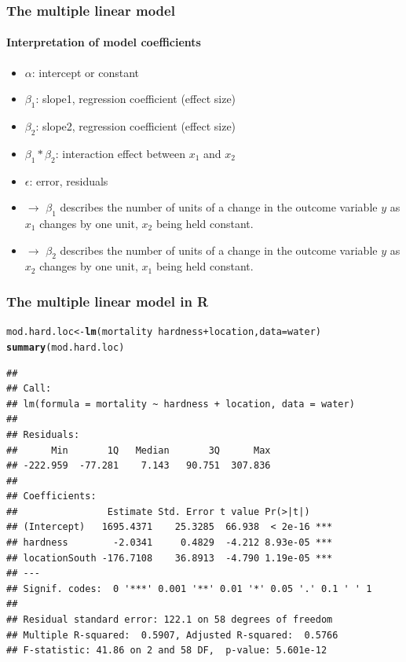 \documentclass{beamer}\usepackage[]{graphicx}\usepackage[]{color}
\makeatletter
\newcommand{\hlopt}[1]{\textcolor[rgb]{0,0,0}{#1}}%
\newcommand{\hlstd}[1]{\textcolor[rgb]{0.345,0.345,0.345}{#1}}%
\newcommand{\hlkwb}[1]{\textcolor[rgb]{0.69,0.353,0.396}{#1}}%
\newcommand{\hlkwc}[1]{\textcolor[rgb]{0.333,0.667,0.333}{#1}}%
\newcommand{\hlkwd}[1]{\textcolor[rgb]{0.737,0.353,0.396}{\textbf{#1}}}%
\newenvironment{kframe}{%
 \def\at@end@of@kframe{}%
 \ifinner\ifhmode%
  \def\at@end@of@kframe{\end{minipage}}%
  \begin{minipage}{\columnwidth}%
 \fi\fi%
 \def\FrameCommand##1{\hskip\@totalleftmargin \hskip-\fboxsep
 \colorbox{shadecolor}{##1}\hskip-\fboxsep
     \hskip-\linewidth \hskip-\@totalleftmargin \hskip\columnwidth}%
 \MakeFramed {\advance\hsize-\width
   \@totalleftmargin\z@ \linewidth\hsize
   \@setminipage}}%
 {\par\unskip\endMakeFramed%
 \at@end@of@kframe}
\newenvironment{knitrout}{}{} %
\makeatother
\begin{document}
{{{%

\usebackgroundtemplate{}
\begin{frame}
\frametitle{The multiple linear model}
\framesubtitle{Interpretation of model coefficients}
\begin{itemize}
\item $\alpha$: intercept or constant
\item $\beta_1$: slope1, regression coefficient (effect size)
\item $\beta_2$: slope2, regression coefficient (effect size)
\item $\beta_1 * \beta_2$: interaction effect between $x_1$ and $x_2$
\item $\epsilon$: error, residuals
\end{itemize}
\begin{itemize}
\item $\rightarrow$ $\beta_1$ describes the number of units of a change in the outcome variable $y$
as $x_1$ changes by one unit, $x_2$ being held constant.
\item $\rightarrow$ $\beta_2$ describes the number of units of a change in the outcome variable $y$
as $x_2$ changes by one unit, $x_1$ being held constant.
\end{itemize}
\end{frame}


\begin{frame}[fragile]
\frametitle{The multiple linear model in R}
\begin{knitrout}\scriptsize
{}\color{fgcolor}\begin{kframe}
\begin{alltt}
\hlstd{mod.hard.loc} \hlkwb{<-} \hlkwd{lm}\hlstd{(mortality} \hlopt{~} \hlstd{hardness} \hlopt{+} \hlstd{location,} \hlkwc{data} \hlstd{= water)}
\hlkwd{summary}\hlstd{(mod.hard.loc)}
\end{alltt}
\begin{verbatim}
## 
## Call:
## lm(formula = mortality ~ hardness + location, data = water)
## 
## Residuals:
##      Min       1Q   Median       3Q      Max 
## -222.959  -77.281    7.143   90.751  307.836 
## 
## Coefficients:
##                Estimate Std. Error t value Pr(>|t|)    
## (Intercept)   1695.4371    25.3285  66.938  < 2e-16 ***
## hardness        -2.0341     0.4829  -4.212 8.93e-05 ***
## locationSouth -176.7108    36.8913  -4.790 1.19e-05 ***
## ---
## Signif. codes:  0 '***' 0.001 '**' 0.01 '*' 0.05 '.' 0.1 ' ' 1
## 
## Residual standard error: 122.1 on 58 degrees of freedom
## Multiple R-squared:  0.5907,	Adjusted R-squared:  0.5766 
## F-statistic: 41.86 on 2 and 58 DF,  p-value: 5.601e-12
\end{verbatim}
\end{kframe}
\end{knitrout}
\end{frame}

}}}
\end{document}
